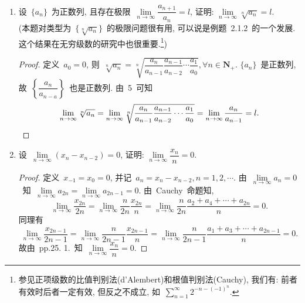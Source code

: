 \documentclass[UTF8,a4paper,11pt,twoside]{book}
\begin{document}
\begin{enumerate}
\begin{proof}
		      若~$A>0$, 则~$\lim\limits_{n\to\infty} \dfrac{1}{a_n}=\dfrac{1}{A}$, 由~Cauchy~命题知
		      \[
			      \lim\limits_{n\to\infty} \dfrac{n}{\frac{1}{a_1}+\frac{1}{a_2}+\cdots+\frac{1}{a_n}}=\lim\limits_{n\to\infty} \dfrac{1}{\dfrac{\frac{1}{a_1}+\frac{1}{a_2}+\cdots+\frac{1}{a_n}}{n}}=\dfrac{1}{\frac{1}{A}}=A,
		      \]
		      \[
			      \lim\limits_{n\to\infty} \dfrac{a_1+a_2+\cdots+a_n}{n}=A.
		      \]
		      故由夹逼定理知, $\lim\limits_{n\to\infty} (a_1a_2\cdots a_n)^\frac{1}{n}=A$.\qedhere
	      \end{proof}
	\item 设~$\{a_n\}$~为正数列, 且存在极限~$\lim\limits_{n\to\infty} \dfrac{a_{n+1}}{a_n}=l$, 证明: $\lim\limits_{n\to\infty} \sqrt[n]{a_n}=l$.\\
	      (本题对类型为~$\{\sqrt[n]{a_n}\}$~的极限问题很有用, 可以说是例题~2.1.2~的一个发展. 这个结果在无穷级数的研究中也很重要.\footnote{参见正项级数的比值判别法(d'Alembert)和根值判别法(Cauchy), 我们有: 前者有效时后者一定有效, 但反之不成立, 如~$\sum_{n=1}^{\infty} 2^{-n-(-1)^n}$.})
	      \begin{proof}
		      定义~$a_0=0$, 则~$\sqrt[n]{a_n}=\sqrt[n]{\dfrac{a_n}{a_{n-1}}\dfrac{a_{n-1}}{a_{n-2}}\cdots\dfrac{a_1}{a_0}}, \forall n\in\mathbf{N}_{+}$. $\{a_n\}$~是正数列, 故~$\left\{\dfrac{a_n}{a_{n-a}}\right\}$~也是正数列. 由~5~可知
		      \[
			      \lim\limits_{n\to\infty} \sqrt[n]{a_n}=\lim\limits_{n\to\infty} \sqrt[n]{\dfrac{a_n}{a_{n-1}}\dfrac{a_{n-1}}{a_{n-2}}\cdots\dfrac{a_1}{a_0}}=\lim\limits_{n\to\infty} \dfrac{a_n}{a_{n-1}}=l.\qedhere
		      \]
	      \end{proof}
	\item 设~$\lim\limits_{n\to\infty} (x_n-x_{n-2})=0$, 证明: $\lim\limits_{n\to\infty} \dfrac{x_n}{n}=0$.
	      \begin{proof}
		      定义~$x_{-1}=x_0=0$, 并记~$a_n=x_n-x_{n-2}, n=1,2,\cdots$. 由~$\lim\limits_{n\to\infty} a_n=0$~知~$\lim\limits_{n\to\infty} a_{2n}=\lim\limits_{n\to\infty} a_{2n-1}=0$. 由~Cauchy~命题知,
		      \[
			      \lim\limits_{n\to\infty} \dfrac{x_{2n}}{2n}=\lim\limits_{n\to\infty} \dfrac{n}{2n}\dfrac{x_{2n}}{n}=\lim\limits_{n\to\infty} \dfrac{n}{2n}\dfrac{a_2+a_4+\cdots+a_{2n}}{n}=0.
		      \]
		      同理有
		      \[
			      \lim\limits_{n\to\infty} \dfrac{x_{2n-1}}{2n-1}=\lim\limits_{n\to\infty} \dfrac{n}{2n-1}\dfrac{x_{2n-1}}{n}=\lim\limits_{n\to\infty} \dfrac{n}{2n-1}\dfrac{a_1+a_3+\cdots+a_{2n-1}}{n}=0.
		      \]
		      故由~pp.25. 1.~知~$\lim\limits_{n\to\infty} \dfrac{x_n}{n}=0$.\qedhere
	      \end{proof}

\end{enumerate}
\end{document}
